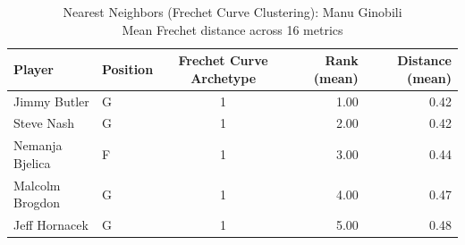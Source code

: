 \begin{table}[t]
\caption*{
{\fontsize{20}{25} Nearest Neighbors (Frechet Curve Clustering): Manu Ginobili\fontsize{12}{15}\selectfont } \\ 
{\fontsize{14}{17}\selectfont  Mean Frechet distance across 16 metrics\fontsize{12}{15}\selectfont }
} 
\fontsize{12.0pt}{14.0pt}\selectfont
\begin{tabular*}{\linewidth}{@{\extracolsep{\fill}}llcrr}
\toprule
Player & Position & Frechet Curve Archetype & Rank (mean) & Distance (mean) \\ 
\midrule\addlinespace[2.5pt]
Jimmy Butler & G & 1 & 1.00 & 0.42 \\ 
Steve Nash & G & 1 & 2.00 & 0.42 \\ 
Nemanja Bjelica & F & 1 & 3.00 & 0.44 \\ 
Malcolm Brogdon & G & 1 & 4.00 & 0.47 \\ 
Jeff Hornacek & G & 1 & 5.00 & 0.48 \\ 
\bottomrule
\end{tabular*}
\end{table}

